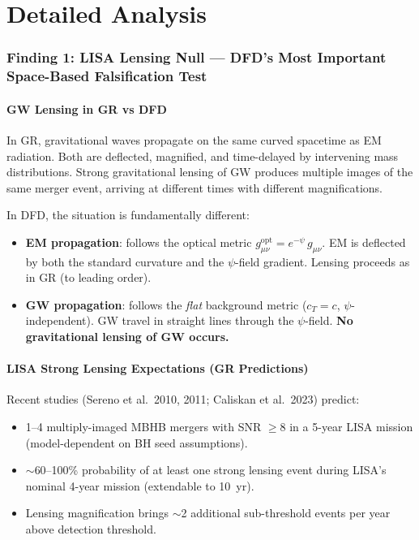 \documentclass[11pt]{article}
\theoremstyle{definition}
\theoremstyle{remark}
\begin{document}
\part{Detailed Analysis}

\section{Finding 1: LISA Lensing Null --- DFD's Most Important
  Space-Based Falsification Test}
\label{sec:lisa}

\subsection{GW Lensing in GR vs DFD}

In GR, gravitational waves propagate on the same curved spacetime
as EM radiation.  Both are deflected, magnified, and time-delayed
by intervening mass distributions.  Strong gravitational lensing
of GW produces multiple images of the same merger event, arriving
at different times with different magnifications.

In DFD, the situation is fundamentally different:
\begin{itemize}[nosep]
\item \textbf{EM propagation}: follows the optical metric
  $g_{\mu\nu}^{\mathrm{opt}} = e^{-\psi}\,g_{\mu\nu}$.
  EM is deflected by both the standard curvature and the
  $\psi$-field gradient.  Lensing proceeds as in GR
  (to leading order).
\item \textbf{GW propagation}: follows the \emph{flat} background
  metric ($c_T = c$, $\psi$-independent).  GW travel in straight
  lines through the $\psi$-field.  \textbf{No gravitational
  lensing of GW occurs.}
\end{itemize}

\subsection{LISA Strong Lensing Expectations (GR Predictions)}

Recent studies (Sereno et al.\ 2010, 2011; Caliskan et al.\ 2023)
predict:
\begin{itemize}[nosep]
\item 1--4 multiply-imaged MBHB mergers with SNR $\geq 8$ in a
  5-year LISA mission (model-dependent on BH seed assumptions).
\item $\sim$60--100\% probability of at least one strong lensing
  event during LISA's nominal 4-year mission (extendable to 10~yr).
\item Lensing magnification brings $\sim$2 additional sub-threshold
  events per year above detection threshold.
\end{itemize}
\end{document}
